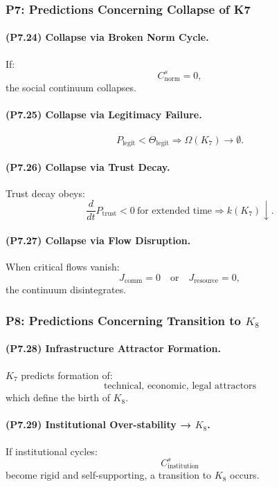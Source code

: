 \subsubsection{P7: Predictions Concerning Collapse of K7}

\paragraph{(P7.24) Collapse via Broken Norm Cycle.}
If:
\[
C_{\mathrm{norm}}^s = 0,
\]
the social continuum collapses.

\paragraph{(P7.25) Collapse via Legitimacy Failure.}
\[
P_{\mathrm{legit}} < \Theta_{\mathrm{legit}}
\Rightarrow 
\Omega(K_7) \to \emptyset.
\]

\paragraph{(P7.26) Collapse via Trust Decay.}
Trust decay obeys:
\[
\frac{d}{dt} P_{\mathrm{trust}} < 0 \ \text{for extended time}
\Rightarrow 
k(K_7) \downarrow.
\]

\paragraph{(P7.27) Collapse via Flow Disruption.}
When critical flows vanish:
\[
J_{\mathrm{comm}} = 0
\quad \text{or} \quad
J_{\mathrm{resource}} = 0,
\]
the continuum disintegrates.

\subsubsection{P8: Predictions Concerning Transition to \texorpdfstring{$K_8$}{K_8}}

\paragraph{(P7.28) Infrastructure Attractor Formation.}
$K_7$ predicts formation of:
\[
\text{technical, economic, legal attractors}
\]
which define the birth of $K_8$.

\paragraph{(P7.29) Institutional Over-stability → \texorpdfstring{$K_8$}{K_8}.}
If institutional cycles:
\[
C_{\mathrm{institution}}^s
\]
become rigid and self-supporting, a transition to $K_8$ occurs.

